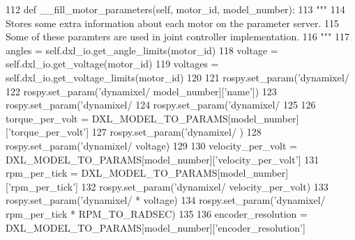 \begin{DoxyCode}
112     \textcolor{keyword}{def }\_\_fill\_motor\_parameters(self, motor\_id, model\_number):
113         \textcolor{stringliteral}{"""}
114 \textcolor{stringliteral}{        Stores some extra information about each motor on the parameter server.}
115 \textcolor{stringliteral}{        Some of these paramters are used in joint controller implementation.}
116 \textcolor{stringliteral}{        """}
117         angles = self.dxl\_io.get\_angle\_limits(motor\_id)
118         voltage = self.dxl\_io.get\_voltage(motor\_id)
119         voltages = self.dxl\_io.get\_voltage\_limits(motor\_id)
120         
121         rospy.set\_param(\textcolor{stringliteral}{'dynamixel/%
122         rospy.set\_param(\textcolor{stringliteral}{'dynamixel/%
      model\_number][\textcolor{stringliteral}{'name'}])
123         rospy.set\_param(\textcolor{stringliteral}{'dynamixel/%
124         rospy.set\_param(\textcolor{stringliteral}{'dynamixel/%
125         
126         torque\_per\_volt = DXL\_MODEL\_TO\_PARAMS[model\_number][\textcolor{stringliteral}{'torque\_per\_volt'}]
127         rospy.set\_param(\textcolor{stringliteral}{'dynamixel/%
      )
128         rospy.set\_param(\textcolor{stringliteral}{'dynamixel/%
      voltage)
129         
130         velocity\_per\_volt = DXL\_MODEL\_TO\_PARAMS[model\_number][\textcolor{stringliteral}{'velocity\_per\_volt'}]
131         rpm\_per\_tick = DXL\_MODEL\_TO\_PARAMS[model\_number][\textcolor{stringliteral}{'rpm\_per\_tick'}]
132         rospy.set\_param(\textcolor{stringliteral}{'dynamixel/%
      velocity\_per\_volt)
133         rospy.set\_param(\textcolor{stringliteral}{'dynamixel/%
      * voltage)
134         rospy.set\_param(\textcolor{stringliteral}{'dynamixel/%
       rpm\_per\_tick * RPM\_TO\_RADSEC)
135         
136         encoder\_resolution = DXL\_MODEL\_TO\_PARAMS[model\_number][\textcolor{stringliteral}{'encoder\_resolution'}]
}}}}}}}}}
\end{DoxyCode}
